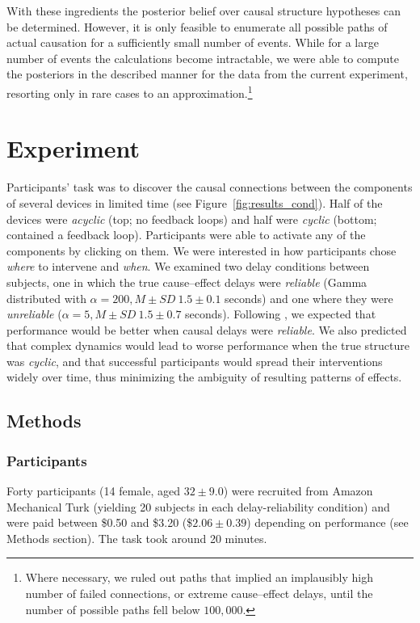 \documentclass[10pt,letterpaper]{article}
\begin{document}
With these ingredients the posterior belief over causal structure hypotheses can be determined. However, it is only feasible to enumerate all possible paths of actual causation for a sufficiently small number of events. While for a large number of events the calculations become intractable, we were able to compute the posteriors in the described manner for the data from the current experiment, resorting only in rare cases to an approximation.\footnote{Where necessary, we ruled out paths that implied an implausibly high number of failed connections, or extreme cause--effect delays, until the number of possible paths fell below $100,000$.}

\section{Experiment}

Participants' task was to discover the causal connections between the components of several devices in limited time (see Figure~\ref{fig:results_cond}). Half of the devices were \emph{acyclic} (top; no feedback loops) and half were \emph{cyclic} (bottom; contained a feedback loop).
Participants were able to activate any of the components by clicking on them. 
We were interested in how participants chose \emph{where} to intervene and \emph{when}.  We examined two delay conditions between subjects, one in which the true cause--effect delays were \emph{reliable} (Gamma distributed with $\alpha=200, M\pm SD~1.5\pm0.1$ seconds) and one where they were \emph{unreliable} ($\alpha=5, M\pm SD~1.5\pm0.7$ seconds). 
Following \cite{greville2010temporal}, we expected that performance would be better when causal delays were \emph{reliable}.  We also predicted that complex dynamics would lead to worse performance when the true structure was \emph{cyclic}, and that successful participants would spread their interventions widely over time, thus minimizing the ambiguity of resulting patterns of effects.

\subsection{Methods}

\subsubsection*{Participants}
 
Forty participants (14 female, aged $32\pm 9.0$) were recruited from Amazon Mechanical Turk (yielding 20 subjects in each delay-reliability condition) and were paid between \$0.50 and \$3.20 (\$$2.06\pm0.39$) depending on performance (see Methods section).  The task took around 20 minutes.
\end{document}
